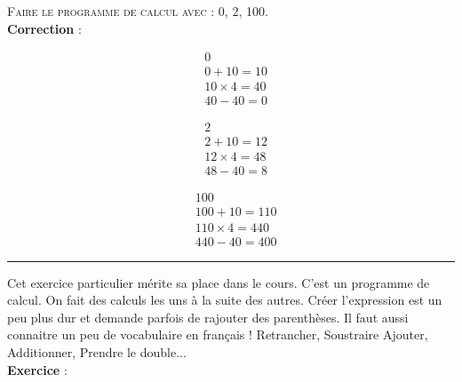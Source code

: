 \documentclass[11pt]{article}
\newcommand{\horrule}[1]{\rule{\linewidth}{#1}} %
\begin{document}
\textsc{Faire le programme de calcul avec : 0, 2, 100.} \\

\textbf{Correction} :

\begin{minipage}{0.3\textwidth}

\begin{align*}
& 0 \\
& 0 + 10 = 10 \\
& 10 \times 4 = 40\\
& 40 - 40 = 0
\end{align*}

\end{minipage}\begin{minipage}{0.3\textwidth}

\begin{align*}
& 2 \\
& 2 + 10 = 12 \\
& 12 \times 4 = 48\\
& 48 - 40 = 8
\end{align*}

\end{minipage}\begin{minipage}{0.3\textwidth}

\begin{align*}
& 100 \\
& 100 + 10 = 110 \\
& 110 \times 4 = 440\\
& 440 - 40 = 400
\end{align*}

\end{minipage}

\vspace{1.5cm}\horrule{1px}\vspace{1.5cm}

Cet exercice particulier mérite sa place dans le cours. C'est un programme de calcul. On fait des calculs les uns à la suite des autres. Créer l'expression est un peu plus dur et demande parfois de rajouter des parenthèses. Il faut aussi connaitre un peu de vocabulaire en français ! Retrancher, Soustraire Ajouter, Additionner, Prendre le double... \\

\textbf{Exercice} : 

\begin{center}\end{center}
\end{document}

